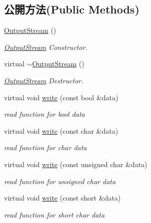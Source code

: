 \subsection*{公開方法(Public Methods)}
\begin{DoxyCompactItemize}
\item 
\hyperlink{class_i_dream_sky_1_1_output_stream_a3dc6afbd2233dcbfdce4e199d8b4e55d}{Output\+Stream} ()
\begin{DoxyCompactList}\small\item\em \hyperlink{class_i_dream_sky_1_1_output_stream}{Output\+Stream} Constructor. \end{DoxyCompactList}\item 
virtual \hyperlink{class_i_dream_sky_1_1_output_stream_a0e63481676582adb93cae5970d16d37a}{$\sim$\+Output\+Stream} ()
\begin{DoxyCompactList}\small\item\em \hyperlink{class_i_dream_sky_1_1_output_stream}{Output\+Stream} Destructor. \end{DoxyCompactList}\item 
virtual void \hyperlink{class_i_dream_sky_1_1_output_stream_a6df894c65be4c31bc8b22d7156c8e2ea}{write} (const bool \&data)
\begin{DoxyCompactList}\small\item\em read function for bool data \end{DoxyCompactList}\item 
virtual void \hyperlink{class_i_dream_sky_1_1_output_stream_adac686febd56e8a037ff4057a867f0e6}{write} (const char \&data)
\begin{DoxyCompactList}\small\item\em read function for char data \end{DoxyCompactList}\item 
virtual void \hyperlink{class_i_dream_sky_1_1_output_stream_ac903cdb4a060bf7fe1fb2f227636a8f4}{write} (const unsigned char \&data)
\begin{DoxyCompactList}\small\item\em read function for unsigned char data \end{DoxyCompactList}\item 
virtual void \hyperlink{class_i_dream_sky_1_1_output_stream_a1a3a6d2105acd50b52204aeb97146348}{write} (const short \&data)
\begin{DoxyCompactList}\small\item\em read function for short char data \end{DoxyCompactList}\item 

\end{DoxyCompactItemize}
